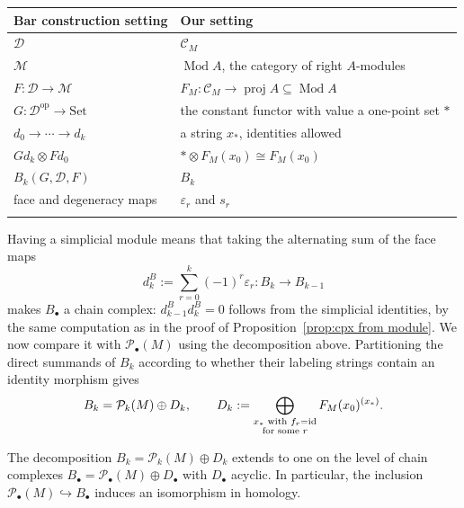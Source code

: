\documentclass[a4paper,leqno]{amsart}
\begin{document}
\begin{center}
\begin{tabular}{p{}p{}}
\hline
Bar construction setting & Our setting\\
\hline
$\mathcal D$ & $\mathcal C_M$\\[3pt]
$\mathcal M$ & $\operatorname{Mod}A$, the category of right $A$-modules\\[3pt]
$F\colon\mathcal D\to\mathcal M$ & $F_M\colon\mathcal C_M\to\operatorname{proj}A\subseteq\operatorname{Mod}A$\\[3pt]
$G\colon\mathcal D^{\mathrm{op}}\to\mathrm{Set}$ & the constant functor with value a one-point set $\ast$\\[3pt]
$d_0\to\cdots\to d_k$ & a string $x_\ast$, identities allowed\\[3pt]
$Gd_k\otimes Fd_0$ & $\ast\otimes F_M(x_0)\cong F_M(x_0)$\\[3pt]
$B_k(G,\mathcal D,F)$ & $B_k$\\[3pt]
face and degeneracy maps & $\varepsilon_r$ and $s_r$\\
\hline\\[3pt]
\end{tabular}
\end{center}

Having a simplicial module means that taking the alternating sum of the face maps
\[
 d^B_k:=\sum_{r=0}^k(-1)^r\varepsilon_r\colon B_k\longrightarrow B_{k-1}
\]
makes $B_\bullet$ a chain complex: $d^B_{k-1}d^B_k=0$ follows from the simplicial identities, by the same computation as in the proof of Proposition~\ref{prop:cpx from module}. 
We now compare it with $\mathcal P_\bullet(M)$ using the decomposition above.
Partitioning the direct summands of $B_k$ according to whether their labeling strings contain an identity morphism gives
\[
 B_k=\mathcal P_k(M)\oplus D_k,
 \qquad
 D_k:=\bigoplus_{\substack{x_\ast\text{ with }f_r=\operatorname{id}\\ \text{for some }r}}F_M(x_0)^{(x_\ast)}.
\]
\begin{prop}\label{prop:bar-construction-decomposition}
The decomposition $B_k=\mathcal P_k(M)\oplus D_k$ extends to one on the level of chain complexes $B_\bullet=\mathcal P_\bullet(M)\oplus D_\bullet$ with $D_\bullet$ acyclic.
In particular, the inclusion $\mathcal P_\bullet(M)\hookrightarrow B_\bullet$ induces an isomorphism in homology.
\end{prop}
\end{document}
